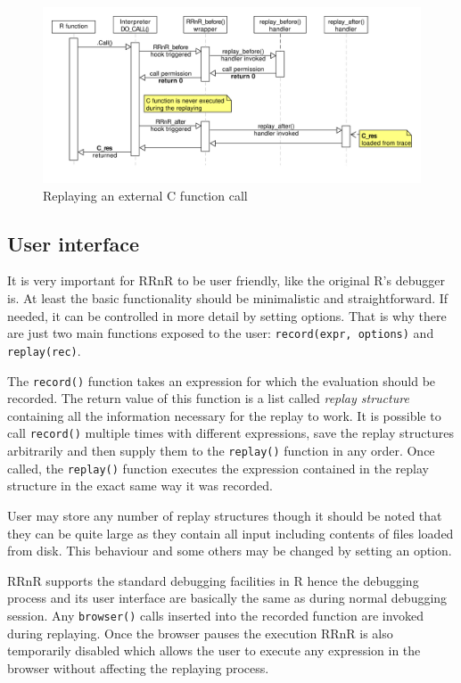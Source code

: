 \documentclass[thesis=M,english,hidelinks]{FITthesis}[2012/10/20]
\begin{document}
		\begin{figure}[ht]\centering
			\includegraphics[width=1.0\textwidth]{img/call_capturing2}
			\caption{Replaying an external C function call}\label{fig:call_capturing2}
		\end{figure}
		
		\subsection{User interface}
		It is very important for RRnR to be user friendly, like the original R's debugger is. At least the basic functionality should be minimalistic and straightforward. If needed, it can be controlled in more detail by setting options. That is why there are just two main functions exposed to the user: \lstinline|record(expr, options)| and \lstinline|replay(rec)|.\par
		
		The \lstinline|record()| function takes an expression for which the evaluation should be recorded. The return value of this function is a list called \emph{replay structure} containing all the information necessary for the replay to work. It is possible to call \lstinline|record()| multiple times with different expressions, save the replay structures arbitrarily and then supply them to the \lstinline|replay()| function in any order. Once called, the \lstinline|replay()| function executes the expression contained in the replay structure in the exact same way it was recorded.\par
		
		User may store any number of replay structures though it should be noted that they can be quite large as they contain all input including contents of files loaded from disk. This behaviour and some others may be changed by setting an option.\par
		
		RRnR supports the standard debugging facilities in R hence the debugging process and its user interface are basically the same as during normal debugging session. Any \lstinline|browser()| calls inserted into the recorded function are invoked during replaying. Once the browser pauses the execution RRnR is also temporarily disabled which allows the user to execute any expression in the browser without affecting the replaying process.\par
\end{document}
